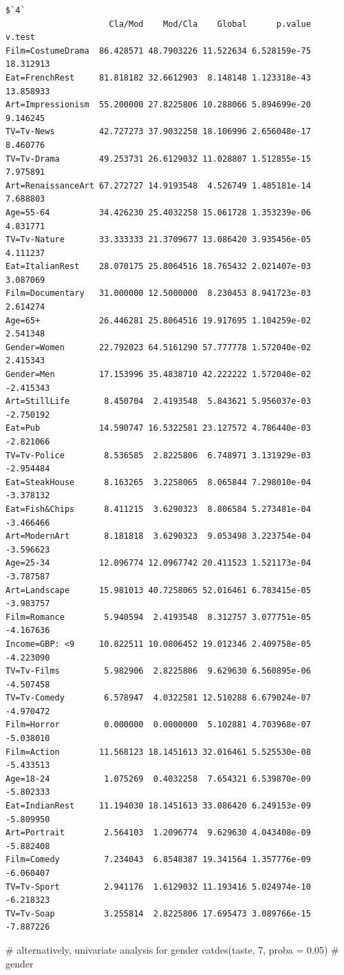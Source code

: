 \documentclass[
  letterpaper,
  DIV=11,
  numbers=noendperiod]{scrartcl}
\newenvironment{Shaded}{\begin{snugshade}}{\end{snugshade}}
\newcommand{\AttributeTok}[1]{\textcolor[rgb]{0.40,0.45,0.13}{#1}}
\newcommand{\CommentTok}[1]{\textcolor[rgb]{0.37,0.37,0.37}{#1}}
\newcommand{\DecValTok}[1]{\textcolor[rgb]{0.68,0.00,0.00}{#1}}
\newcommand{\FloatTok}[1]{\textcolor[rgb]{0.68,0.00,0.00}{#1}}
\newcommand{\FunctionTok}[1]{\textcolor[rgb]{0.28,0.35,0.67}{#1}}
\newcommand{\NormalTok}[1]{\textcolor[rgb]{0.00,0.23,0.31}{#1}}
\begin{document}
\begin{verbatim}
$`4`
                     Cla/Mod    Mod/Cla    Global      p.value    v.test
Film=CostumeDrama  86.428571 48.7903226 11.522634 6.528159e-75 18.312913
Eat=FrenchRest     81.818182 32.6612903  8.148148 1.123318e-43 13.858933
Art=Impressionism  55.200000 27.8225806 10.288066 5.894699e-20  9.146245
TV=Tv-News         42.727273 37.9032258 18.106996 2.656048e-17  8.460776
TV=Tv-Drama        49.253731 26.6129032 11.028807 1.512855e-15  7.975891
Art=RenaissanceArt 67.272727 14.9193548  4.526749 1.485181e-14  7.688803
Age=55-64          34.426230 25.4032258 15.061728 1.353239e-06  4.831771
TV=Tv-Nature       33.333333 21.3709677 13.086420 3.935456e-05  4.111237
Eat=ItalianRest    28.070175 25.8064516 18.765432 2.021407e-03  3.087069
Film=Documentary   31.000000 12.5000000  8.230453 8.941723e-03  2.614274
Age=65+            26.446281 25.8064516 19.917695 1.104259e-02  2.541348
Gender=Women       22.792023 64.5161290 57.777778 1.572040e-02  2.415343
Gender=Men         17.153996 35.4838710 42.222222 1.572040e-02 -2.415343
Art=StillLife       8.450704  2.4193548  5.843621 5.956037e-03 -2.750192
Eat=Pub            14.590747 16.5322581 23.127572 4.786440e-03 -2.821066
TV=Tv-Police        8.536585  2.8225806  6.748971 3.131929e-03 -2.954484
Eat=SteakHouse      8.163265  3.2258065  8.065844 7.298010e-04 -3.378132
Eat=Fish&Chips      8.411215  3.6290323  8.806584 5.273481e-04 -3.466466
Art=ModernArt       8.181818  3.6290323  9.053498 3.223754e-04 -3.596623
Age=25-34          12.096774 12.0967742 20.411523 1.521173e-04 -3.787587
Art=Landscape      15.981013 40.7258065 52.016461 6.783415e-05 -3.983757
Film=Romance        5.940594  2.4193548  8.312757 3.077751e-05 -4.167636
Income=GBP: <9     10.822511 10.0806452 19.012346 2.409758e-05 -4.223090
TV=Tv-Films         5.982906  2.8225806  9.629630 6.560895e-06 -4.507458
TV=Tv-Comedy        6.578947  4.0322581 12.510288 6.679024e-07 -4.970472
Film=Horror         0.000000  0.0000000  5.102881 4.703968e-07 -5.038010
Film=Action        11.568123 18.1451613 32.016461 5.525530e-08 -5.433513
Age=18-24           1.075269  0.4032258  7.654321 6.539870e-09 -5.802333
Eat=IndianRest     11.194030 18.1451613 33.086420 6.249153e-09 -5.809950
Art=Portrait        2.564103  1.2096774  9.629630 4.043408e-09 -5.882408
Film=Comedy         7.234043  6.8548387 19.341564 1.357776e-09 -6.060407
TV=Tv-Sport         2.941176  1.6129032 11.193416 5.024974e-10 -6.218323
TV=Tv-Soap          3.255814  2.8225806 17.695473 3.089766e-15 -7.887226
\end{verbatim}

\begin{Shaded}
\begin{Highlighting}[]
\CommentTok{\# alternatively, univariate analysis for gender}
\FunctionTok{catdes}\NormalTok{(taste, }\DecValTok{7}\NormalTok{, }\AttributeTok{proba =} \FloatTok{0.05}\NormalTok{) }\CommentTok{\# gender}
\end{Highlighting}
\end{Shaded}
\end{document}
